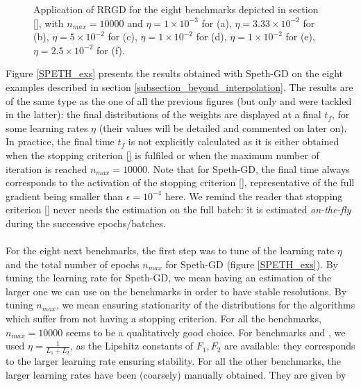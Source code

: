\begin{figure}[h!]
	\centering
        \scalebox{0.45}{}
	\caption{
          Application of RRGD for the eight benchmarks depicted in section \ref{}, with $n_{max}=10000$ and 
        $\eta = 1\times 10^{-3}$ for \exThree (a), 
  $\eta = 3.33\times 10^{-2}$ for \exFour (b), 
  $\eta = 5 \times 10^{-2}$ for \exFive (c), 
  $\eta = 1 \times 10^{-2}$ for \exSix (d), 
  $\eta = 1 \times 10^{-2}$ for \exSeven (e), 
  $\eta = 2.5 \times 10^{-2}$ for \exHeight (f). 
        }
	\label{SGD_exs}
\end{figure}

Figure \ref{SPETH_exs} presents the results obtained with Speth-GD on the eight examples described in section \ref{subsection_beyond_interpolation}. 
The results are of the same type as the one of all the previous figures (but only \exOne and \exTwo were tackled in the latter): the final distributions of the weights are
displayed at a final $t_f$, for some learning rates $\eta$ (their values will be detailed and commented on later on).  
In practice, the final time $t_f$ is not explicitly calculated as it is either obtained when the stopping criterion \eqref{} is fulfiled or when the maximum number of iteration is reached
$n_{max} = 10000$.  
Note that for Speth-GD, the final time always corresponds to the activation of the stopping criterion \eqref{}, representative of the full gradient being smaller than $\epsilon =
10^{-4}$ here. We remind the reader that stopping criterion \eqref{} never needs the estimation on the full batch: it is estimated {\em on-the-fly} during the successive
epochs/batches.  
\ \\ \ \\
For the eight next benchmarks, the first step was to tune of the learning rate $\eta$ and the total number of epochs $n_{max}$ for Speth-GD (figure \ref{SPETH_exs}). 
By tuning the learning rate for Speth-GD, we mean having an estimation of the larger one we can use on the benchmarks in order to 
have stable resolutions. 
By tuning $n_{max}$, we mean ensuring stationarity of the distributions for the algorithms which suffer from not having a stopping criterion.
For all the benchmarks, $n_{max}=10000$ seems to be a qualitatively good choice. 
For benchmarks \exOne and \exTwo, we used $\eta=\frac{1}{L_1+L_2}$, as the Lipshitz constants of $F_1,F_2$ are available: they corresponds to 
the larger learning rate ensuring stability. 
For all the other benchmarks, the larger learning rates have been (coarsely) manually obtained. They are given by 
